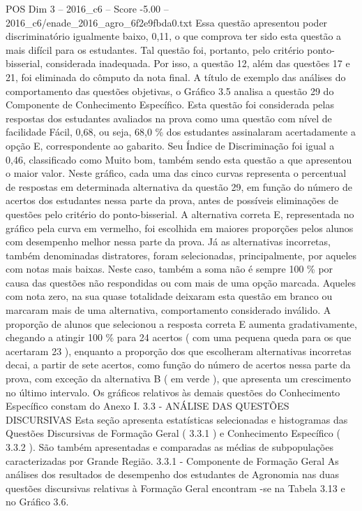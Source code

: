 \begin{textsample}{POS Dim 3 – 2016\_c6 – Score -5.00 – 2016\_c6/enade\_2016\_agro\_6f2e9fbda0.txt}
Essa questão apresentou poder discriminatório igualmente baixo, 0,11, o que comprova ter sido esta questão a mais difícil para os estudantes.
Tal questão foi, portanto, pelo critério ponto-bisserial, considerada inadequada.
Por isso, a questão 12, além das questões 17 e 21, foi eliminada do cômputo da nota final.
A título de exemplo das análises do comportamento das questões objetivas, o Gráfico 3.5 analisa a questão 29 do Componente de Conhecimento Específico.
Esta questão foi considerada pelas respostas dos estudantes avaliados na prova como uma questão com nível de facilidade Fácil, 0,68, ou seja, 68,0 \% dos estudantes assinalaram acertadamente a opção E, correspondente ao gabarito.
Seu Índice de Discriminação foi igual a 0,46, classificado como Muito bom, também sendo esta questão a que apresentou o maior valor.
Neste gráfico, cada uma das cinco curvas representa o percentual de respostas em determinada alternativa da questão 29, em função do número de acertos dos estudantes nessa parte da prova, antes de possíveis eliminações de questões pelo critério do ponto-bisserial.
A alternativa correta E, representada no gráfico pela curva em vermelho, foi escolhida em maiores proporções pelos alunos com desempenho melhor nessa parte da prova.
Já as alternativas incorretas, também denominadas distratores, foram selecionadas, principalmente, por aqueles com notas mais baixas.
Neste caso, também a soma não é sempre 100 \% por causa das questões não respondidas ou com mais de uma opção marcada.
Aqueles com nota zero, na sua quase totalidade deixaram esta questão em branco ou marcaram mais de uma alternativa, comportamento considerado inválido.
A proporção de alunos que selecionou a resposta correta E aumenta gradativamente, chegando a atingir 100 \% para 24 acertos ( com uma pequena queda para os que acertaram 23 ), enquanto a proporção dos que escolheram alternativas incorretas decai, a partir de sete acertos, como função do número de acertos nessa parte da prova, com exceção da alternativa B ( em verde ), que apresenta um crescimento no último intervalo.
Os gráficos relativos às demais questões do Conhecimento Específico constam do Anexo I. 3.3 - ANÁLISE DAS QUESTÕES DISCURSIVAS Esta seção apresenta estatísticas selecionadas e histogramas das Questões Discursivas de Formação Geral ( 3.3.1 ) e Conhecimento Específico ( 3.3.2 ).
São também apresentadas e comparadas as médias de subpopulações caracterizadas por Grande Região. 3.3.1 - Componente de Formação Geral As análises dos resultados de desempenho dos estudantes de Agronomia nas duas questões discursivas relativas à Formação Geral encontram -se na Tabela 3.13 e no Gráfico 3.6.

\end{textsample}

